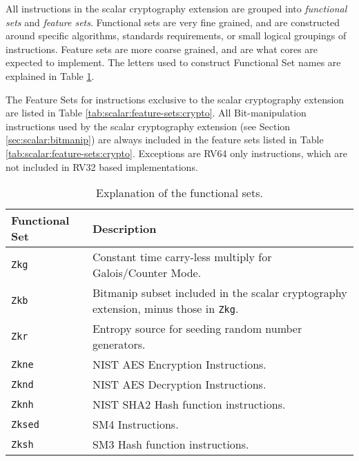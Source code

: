 
All instructions in the scalar cryptography extension are grouped into
{\em functional sets} and {\em feature sets}.
Functional sets are very fine grained, and are constructed around
specific algorithms, standards requirements, or small logical groupings
of instructions.
Feature sets are more coarse grained, and are what cores are expected
to implement.
The letters used to construct Functional Set names are explained in
Table \ref{tab:scalar:functional-sets}.

The Feature Sets for instructions exclusive to the scalar cryptography
extension are listed in
Table \ref{tab:scalar:feature-sets:crypto}.
All Bit-manipulation instructions used by the scalar cryptography extension
(see Section \ref{sec:scalar:bitmanip})
are always included in the feature sets listed in
Table \ref{tab:scalar:feature-sets:crypto}.
Exceptions are RV64 only instructions, which are not included in RV32
based implementations.

\begin{table}[h]
\centering
\begin{tabular}{l|l}
Functional Set    & Description \\
\hline
       {\tt Zkg  }& Constant time carry-less multiply for Galois/Counter Mode.          \\
       {\tt Zkb  }& Bitmanip subset included in the scalar cryptography extension, minus those in {\tt Zkg}. \\
       {\tt Zkr  }& Entropy source for seeding random number generators.                \\
       {\tt Zkne }& NIST AES Encryption Instructions.                                   \\
       {\tt Zknd }& NIST AES Decryption Instructions.                                   \\
       {\tt Zknh }& NIST SHA2 Hash function instructions.                               \\
       {\tt Zksed}& SM4 Instructions.                                        \\
       {\tt Zksh }& SM3 Hash function instructions.                                     \\
\hline
\end{tabular}
\caption{
    Explanation of the functional sets.
}
\label{tab:scalar:functional-sets}
\end{table}

